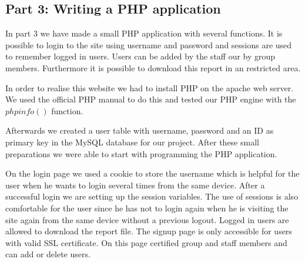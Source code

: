 \subsection {Part 3: Writing a PHP application}


\noindent
In part 3 we have made a small PHP application with several functions. It is possible to login to the site using username and password and sessions are used to remember logged in users. Users can be added by the staff our by group members. Furthermore it is possible to download this report in an restricted area. \newline

\noindent
In order to realise this website we had to install PHP on the apache web server. We used the official PHP manual to do this and tested our PHP engine with the $phpinfo()$ function.\cite{phpinstall}
\newline

\noindent
Afterwards we created a user table with username, password and an ID as primary key  in the MySQL database for our project. After these small preparations we were able to start with programming the PHP application.  \newline

\noindent
On the login page we used a cookie to store the username which is helpful for the user when he wants to login several times from the same device. After a successful login we are setting up the session variables. The use of sessions is also comfortable for the user since he has not to login again when he is visiting the site again from the same device without a previous logout. Logged in users  are allowed to download the report file. The signup page is only accessible for users with valid SSL certificate. On this page certified group and staff members and can add or delete users.
\newline
